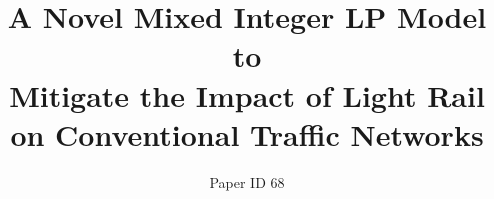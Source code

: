 \documentclass[letterpaper]{article}
\newcommand{\Omit}[1]{}
\begin{document}
\title{A Novel Mixed Integer LP Model to\\ Mitigate
 the Impact of Light Rail on Conventional Traffic Networks}

\author{Paper ID 68}
\Omit{
\author{
Iain Guilliard \and Felipe Trevizan\\
\small Machine Learning Group, NICTA\\
\small Research School of Computer Science, ANU\\
\small iain.guilliard@nicta.com.au\\
\small felipe.trevizan@nicta.com.au\\
\And Scott Sanner\\
\small Computer Science Department\\
\small Oregon State University\\ 
\small scott.sanner@oregonstate.edu\\
\And Brian Williams\\
\small MERS Group\\
\small Computer Science and AI Laboratory\\
\small MIT\\
\small williams@mit.edu\\
}
}
\date{}

\maketitle

\begin{abstract}
 
\end{abstract}









%



%







\end{document}
